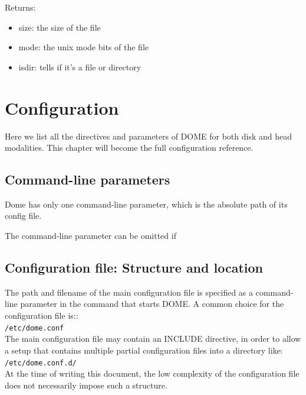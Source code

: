 \documentclass[a4paper,10pt]{scrreprt}
\begin{document}
Returns:
\begin{itemize}
 \item size: the size of the file
 \item mode: the unix mode bits of the file
 \item isdir: tells if it's a file or directory
\end{itemize}




















\chapter{Configuration}
Here we list all the directives and parameters of DOME for both disk and head modalities. This chapter will become the full configuration reference.\\

\section{Command-line parameters}

 Dome has only one command-line parameter, which is the absolute path of its config file.
 
 The command-line parameter can be omitted if 

\section{Configuration file: Structure and location}
The path and filename of the main configuration file is specified as a command-line parameter in the command that starts DOME. A common
choice for the configuration file is::\\

\lstinline"/etc/dome.conf"\\

The main configuration file may contain an INCLUDE directive, in order to allow a setup that contains multiple partial configuration files into a directory like:\\

\lstinline"/etc/dome.conf.d/"\\

At the time of writing this document, the low complexity of the configuration file does not necessarily impose such a structure.
\end{document}
